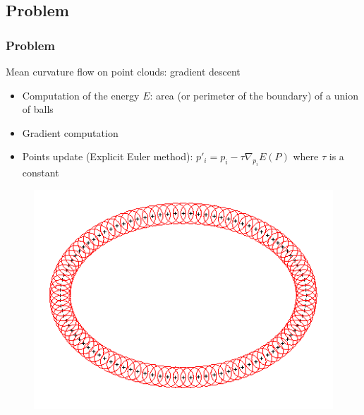\documentclass{beamer}
\begin{document}
\subsection{Problem}
\begin{frame}
    \frametitle{Problem}

    Mean curvature flow on point clouds: gradient descent
    \begin{itemize}
        \item Computation of the energy $ E $: area (or perimeter of the boundary) of a union of balls
        \item Gradient computation
        \item Points update (Explicit Euler method): $ p'_i = p_i - \tau
            \nabla_{p_i} E (P) $ where $ \tau $ is a constant
    \end{itemize}

    \begin{figure}
        \centering
        \includegraphics[scale=0.28]{img/ellipse-balls-15}
    \end{figure}
\end{frame}
\end{document}
